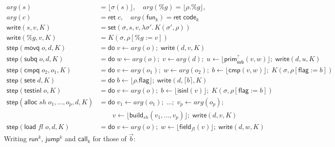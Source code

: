 \documentclass[10pt]{article}
\theoremstyle{acmplain}
\newcommand{\key}[1]{\mathsf{#1}}
\newcommand{\funref}[1]{\key{fun}_{#1}}
\newcommand{\res}[1]{\lceil #1 \rceil}
\newcommand{\codeV}[1]{\key{code}_{#1}}
\newcommand{\Ret}{\key{ret}\;}
\newcommand{\Do}{\key{do}\;}
\newcommand{\lift}[1]{\lfloor #1 \rfloor}
\newcommand{\CALL}[2]{\key{call}^{#1}_{#2}}
\begin{document}
\begin{align*}
  \mathit{arg}(s) &= \lift{\sigma(s)}, \quad
  \mathit{arg}(\%g) = \lift{\rho.\%g}, \\
  \mathit{arg}(c) &= \Ret c, \quad
  \mathit{arg}(\funref{k}) = \Ret \codeV{k} \\
  \key{write}(s, v, K) &= \key{set}(\sigma, s, v, \lambda \sigma'.\, K(\sigma', \rho)) \\
  \key{write}(\%g, v, K) &= K(\sigma, \rho[\%g := v]) \\[1ex]
  \key{step}(\key{movq}\; o, d, K) &= \Do v \leftarrow \mathit{arg}(o);\; \key{write}(d, v, K) \\
  \key{step}(\key{subq}\; o, d, K) &= \Do w \leftarrow \mathit{arg}(o);\; v \leftarrow \mathit{arg}(d);\;
    u \leftarrow \lift{\key{prim}^?_{\key{sub}}(v, w)};\; \key{write}(d, u, K) \\
  \key{step}(\key{cmpq}\; o_2, o_1, K) &= \Do v \leftarrow \mathit{arg}(o_1);\; w \leftarrow \mathit{arg}(o_2);\;
    b \leftarrow \lift{\key{cmp}(v, w)};\; K(\sigma, \rho[\key{flag} := b]) \\
  \key{step}(\key{sete}\; d, K) &= \Do b \leftarrow \lift{\rho.\key{flag}};\; \key{write}(d, \res{b}, K) \\
  \key{step}(\key{testinl}\; o, K) &= \Do v \leftarrow \mathit{arg}(o);\; b \leftarrow \lift{\key{isinl}(v)};\;
    K(\sigma, \rho[\key{flag} := b]) \\
  \key{step}(\key{alloc}\; \mathit{sh}\; o_1, \ldots, o_p, d, K) &=
    \Do v_1 \leftarrow \mathit{arg}(o_1);\; \ldots;\; v_p \leftarrow \mathit{arg}(o_p);\; \\
    &\qquad v \leftarrow \lift{\key{build}_{\mathit{sh}}(v_1, \ldots, v_p)};\; \key{write}(d, v, K) \\
  \key{step}(\key{load}\; \mathit{fl}\; o, d, K) &= \Do v \leftarrow \mathit{arg}(o);\;
    w \leftarrow \lift{\key{field}_{\mathit{fl}}(v)};\; \key{write}(d, w, K)
\end{align*}
Writing $\key{run}^k$, $\key{jump}^k$ and $\CALL{}{k}$ for those of $\vec{b}$:
\end{document}
